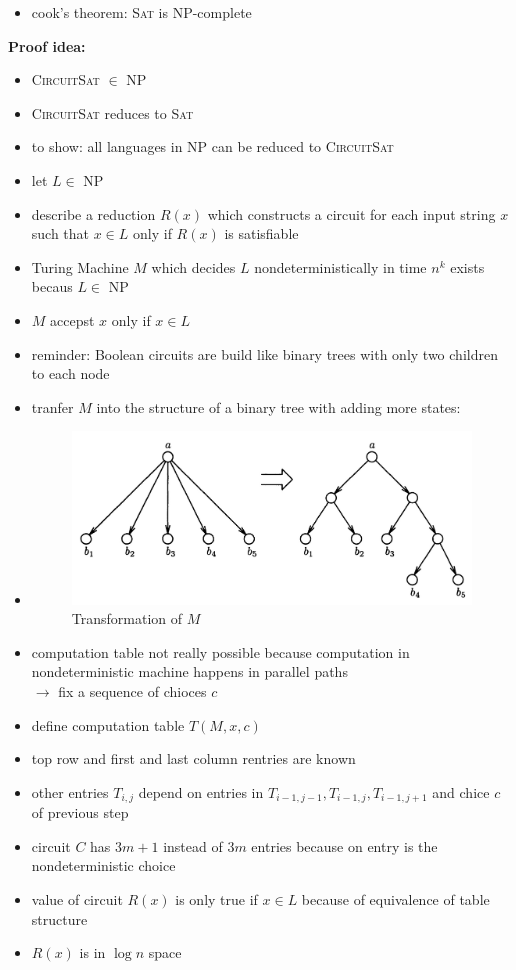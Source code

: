 \documentclass[a4]{scrartcl}
\begin{document}
\begin{itemize}
\item cook's theorem: \textsc{Sat} is \textsc{NP}-complete
\end{itemize} 
\textbf{Proof idea:}
\begin{itemize}
\item \textsc{CircuitSat} $\in$ NP
\item \textsc{CircuitSat} reduces to \textsc{Sat}
\item to show: all languages in NP can be reduced to \textsc{CircuitSat}
\item let $L \in$ NP
\item describe a reduction $R(x)$ which constructs a circuit for each input string $x$ such that $x \in L$ only if $R(x)$ is satisfiable
\item Turing Machine $M$ which decides $L$ nondeterministically in time $n^k$ exists becaus $L \in$ NP
\item $M$ accepst $x$ only if $x \in L$ 
\item reminder: Boolean circuits are build like binary trees with only two children to each node
\item tranfer $M$ into the structure of a binary tree with adding more states:
\item[] \begin{figure}[H]
\begin{center}
\includegraphics[scale=0.5]{tmt.jpg}
\end{center}
\caption{Transformation of $M$ \cite{book}}
\end{figure}
\item computation table not really possible because computation in nondeterministic machine happens in parallel paths \\
$\rightarrow$ fix a sequence of chioces $c$
\item define computation table $T(M, x, c)$
\item top row and first and last column rentries are known
\item other entries $T_{i,j}$ depend on entries in $T_{i-1,j-1}, T_{i-1,j}, T_{i-1,j+1}$ and chice $c$ of previous step
\item circuit $C$ has $3m+1$ instead of $3m$ entries because on entry is the nondeterministic choice
\item value of circuit $R(x)$ is only true if $x \in L$ because of equivalence of table structure
\item $R(x)$ is in $\log n$ space

\end{itemize}
\end{document}
